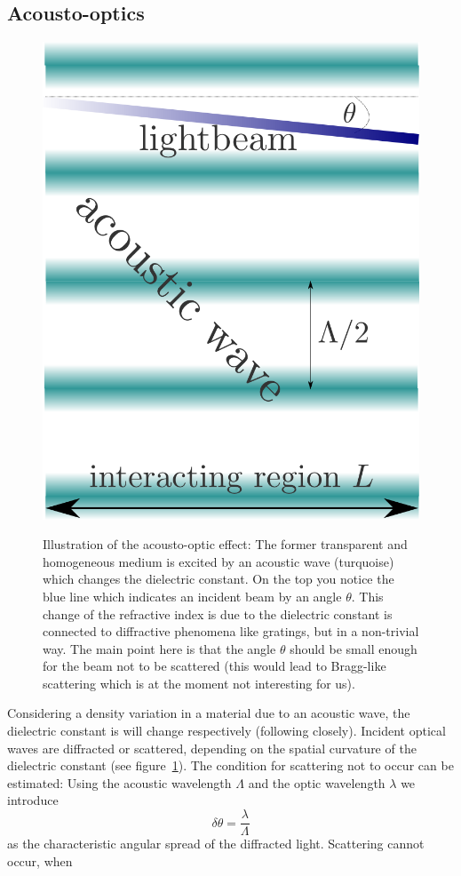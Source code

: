 \subsection{Acousto-optics}
\begin{figure}
    \centering
    \caption{Illustration of the acousto-optic effect: The former transparent and homogeneous medium is
        excited by an acoustic wave (turquoise) which changes the dielectric constant. On the top you notice
        the blue line which indicates an incident beam by an angle $\theta$. 
        This change of the refractive index is due to the dielectric constant is connected 
        to diffractive phenomena like gratings, but in a non-trivial way. 
        The main point here is that the angle $\theta$ should be small enough
        for the beam not to be scattered (this would lead to Bragg-like scattering which is at the moment
            not interesting for us). }
    \includegraphics[width=0.5\linewidth]{figures/ramannath1.png}
    \label{fig:ramannath1}
\end{figure}
Considering a density variation in a material due to an acoustic wave, the dielectric constant is will
change respectively (following \cite{boyd2003nonlinear} closely). 
Incident optical waves are diffracted or scattered, depending on the spatial curvature
of the dielectric constant (see figure~\ref{fig:ramannath1}). The condition for scattering not to occur can
be estimated: Using the acoustic wavelength $\Lambda$ and the optic wavelength $\lambda$ we introduce 
\begin{equation}
    \label{eq:deltatheta}
    \delta \theta = \frac{\lambda}{\Lambda}
\end{equation}
as the characteristic angular spread of the diffracted light. Scattering cannot occur, when 
